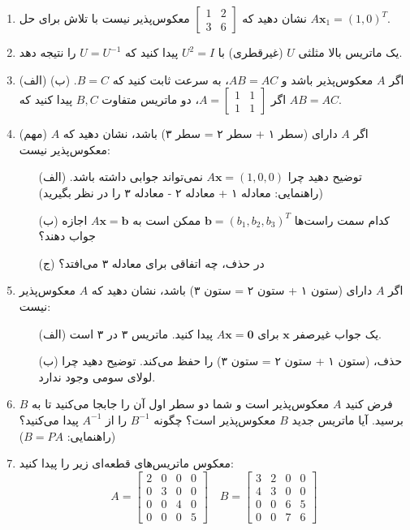 \documentclass[12pt, a4paper]{book}
\begin{document}
\begin{enumerate}
		\item نشان دهید که $\begin{bmatrix} 1 & 2 \\ 3 & 6 \end{bmatrix}$ معکوس‌پذیر نیست با تلاش برای حل $A\mathbf{x}_1=(1,0)^T$.
		
		\item یک ماتریس بالا مثلثی $U$ (غیرقطری) با $U^2=I$ پیدا کنید که $U=U^{-1}$ را نتیجه دهد.
		
		\item (الف) اگر $A$ معکوس‌پذیر باشد و $AB=AC$، به سرعت ثابت کنید که $B=C$.
		(ب) اگر $A = \begin{bmatrix} 1 & 1 \\ 1 & 1 \end{bmatrix}$، دو ماتریس متفاوت $B, C$ پیدا کنید که $AB=AC$.
		
		\item (مهم) اگر $A$ دارای (سطر ۱ + سطر ۲ = سطر ۳) باشد، نشان دهید که $A$ معکوس‌پذیر نیست:
		\begin{itemize}
			\item[(الف)] توضیح دهید چرا $A\mathbf{x}=(1,0,0)$ نمی‌تواند جوابی داشته باشد. (راهنمایی: معادله ۱ + معادله ۲ - معادله ۳ را در نظر بگیرید)
			\item[(ب)] کدام سمت راست‌ها $\mathbf{b}=(b_1, b_2, b_3)^T$ ممکن است به $A\mathbf{x}=\mathbf{b}$ اجازه جواب دهند؟
			\item[(ج)] در حذف، چه اتفاقی برای معادله ۳ می‌افتد؟
		\end{itemize}
		
		\item اگر $A$ دارای (ستون ۱ + ستون ۲ = ستون ۳) باشد، نشان دهید که $A$ معکوس‌پذیر نیست:
		\begin{itemize}
			\item[(الف)] یک جواب غیرصفر $\mathbf{x}$ برای $A\mathbf{x}=\mathbf{0}$ پیدا کنید. ماتریس ۳ در ۳ است.
			\item[(ب)] حذف، (ستون ۱ + ستون ۲ = ستون ۳) را حفظ می‌کند. توضیح دهید چرا لولای سومی وجود ندارد.
		\end{itemize}
		
		\item فرض کنید $A$ معکوس‌پذیر است و شما دو سطر اول آن را جابجا می‌کنید تا به $B$ برسید. آیا ماتریس جدید $B$ معکوس‌پذیر است؟ چگونه $B^{-1}$ را از $A^{-1}$ پیدا می‌کنید؟ (راهنمایی: $B=PA$)
		
		\item معکوس ماتریس‌های قطعه‌ای زیر را پیدا کنید:
		\[ A = \begin{bmatrix} 2 & 0 & 0 & 0 \\ 0 & 3 & 0 & 0 \\ 0 & 0 & 4 & 0 \\ 0 & 0 & 0 & 5 \end{bmatrix} \quad B = \begin{bmatrix} 3 & 2 & 0 & 0 \\ 4 & 3 & 0 & 0 \\ 0 & 0 & 6 & 5 \\ 0 & 0 & 7 & 6 \end{bmatrix} \]
		

\end{enumerate}
\end{document}
